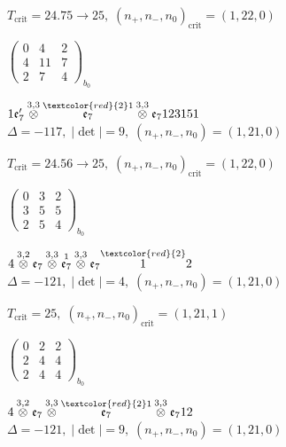 \documentclass[10pt]{article}
\begin{document}
\hspace{1em}$T_{\text{crit}}=24.75 \to 25,\; (n_+,n_-,n_0)_{\text{crit}}=(1,22,0)$

\hspace{2em}$\left(\begin{smallmatrix}0 & 4 & 2 \\ 4 & 11 & 7 \\ 2 & 7 & 4\end{smallmatrix}\right)_{\!b_0}$

\smallskip

$1\mathfrak{e}_7'\overset{3,3}{\otimes}\overset{\textcolor{red}{2}1}{\mathfrak{e}_7}\overset{3,3}{\otimes}\mathfrak{e}_7123151$ \quad $\Delta=-117,\; |\det|=9,\; (n_+,n_-,n_0)=(1,21,0)$

\hspace{1em}$T_{\text{crit}}=24.56 \to 25,\; (n_+,n_-,n_0)_{\text{crit}}=(1,22,0)$

\hspace{2em}$\left(\begin{smallmatrix}0 & 3 & 2 \\ 3 & 5 & 5 \\ 2 & 5 & 4\end{smallmatrix}\right)_{\!b_0}$

\smallskip

$4\overset{3,2}{\otimes}\mathfrak{e}_7\overset{3,3}{\otimes}\overset{1}{\mathfrak{e}_7}\overset{3,3}{\otimes}\mathfrak{e}_7\overset{\textcolor{red}{2}}{1}2$ \quad $\Delta=-121,\; |\det|=4,\; (n_+,n_-,n_0)=(1,21,0)$

\hspace{1em}$T_{\text{crit}}=25,\; (n_+,n_-,n_0)_{\text{crit}}=(1,21,1)$

\hspace{2em}$\left(\begin{smallmatrix}0 & 2 & 2 \\ 2 & 4 & 4 \\ 2 & 4 & 4\end{smallmatrix}\right)_{\!b_0}$

$4\overset{3,2}{\otimes}\mathfrak{e}_7\overset{3,3}{\otimes}\overset{\textcolor{red}{2}1}{\mathfrak{e}_7}\overset{3,3}{\otimes}\mathfrak{e}_712$ \quad $\Delta=-121,\; |\det|=9,\; (n_+,n_-,n_0)=(1,21,0)$
\end{document}
